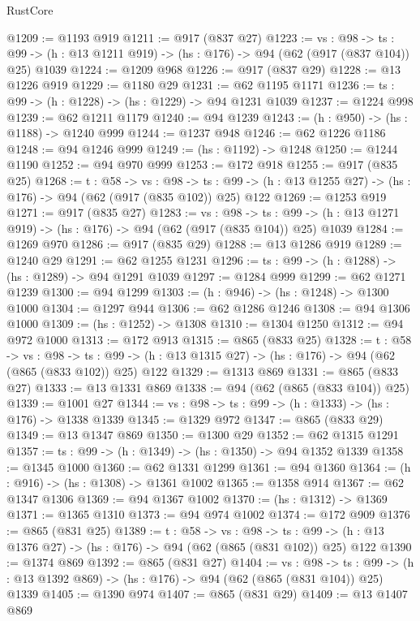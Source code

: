 \begin{lexlean}{RustCore}
\begin{coremodule}
@1209 := @1193 @919
@1211 := @917 (@837 @27)
@1223 := {vs : @98} ->
  {ts : @99} -> (h : @13 @1211 @919) -> (hs : @176) -> @94 (@62 (@917 (@837 @104)) @25) @1039
@1224 := @1209 @968
@1226 := @917 (@837 @29)
@1228 := @13 @1226 @919
@1229 := @1180 @29
@1231 := @62 @1195 @1171
@1236 := {ts : @99} -> (h : @1228) -> (hs : @1229) -> @94 @1231 @1039
@1237 := @1224 @998
@1239 := @62 @1211 @1179
@1240 := @94 @1239
@1243 := (h : @950) -> (hs : @1188) -> @1240 @999
@1244 := @1237 @948
@1246 := @62 @1226 @1186
@1248 := @94 @1246 @999
@1249 := (hs : @1192) -> @1248
@1250 := @1244 @1190
@1252 := @94 @970 @999
@1253 := @172 @918
@1255 := @917 (@835 @25)
@1268 := {t : @58} ->
  {vs : @98} ->
  {ts : @99} -> (h : @13 @1255 @27) -> (hs : @176) -> @94 (@62 (@917 (@835 @102)) @25) @122
@1269 := @1253 @919
@1271 := @917 (@835 @27)
@1283 := {vs : @98} ->
  {ts : @99} -> (h : @13 @1271 @919) -> (hs : @176) -> @94 (@62 (@917 (@835 @104)) @25) @1039
@1284 := @1269 @970
@1286 := @917 (@835 @29)
@1288 := @13 @1286 @919
@1289 := @1240 @29
@1291 := @62 @1255 @1231
@1296 := {ts : @99} -> (h : @1288) -> (hs : @1289) -> @94 @1291 @1039
@1297 := @1284 @999
@1299 := @62 @1271 @1239
@1300 := @94 @1299
@1303 := (h : @946) -> (hs : @1248) -> @1300 @1000
@1304 := @1297 @944
@1306 := @62 @1286 @1246
@1308 := @94 @1306 @1000
@1309 := (hs : @1252) -> @1308
@1310 := @1304 @1250
@1312 := @94 @972 @1000
@1313 := @172 @913
@1315 := @865 (@833 @25)
@1328 := {t : @58} ->
  {vs : @98} ->
  {ts : @99} -> (h : @13 @1315 @27) -> (hs : @176) -> @94 (@62 (@865 (@833 @102)) @25) @122
@1329 := @1313 @869
@1331 := @865 (@833 @27)
@1333 := @13 @1331 @869
@1338 := @94 (@62 (@865 (@833 @104)) @25)
@1339 := @1001 @27
@1344 := {vs : @98} -> {ts : @99} -> (h : @1333) -> (hs : @176) -> @1338 @1339
@1345 := @1329 @972
@1347 := @865 (@833 @29)
@1349 := @13 @1347 @869
@1350 := @1300 @29
@1352 := @62 @1315 @1291
@1357 := {ts : @99} -> (h : @1349) -> (hs : @1350) -> @94 @1352 @1339
@1358 := @1345 @1000
@1360 := @62 @1331 @1299
@1361 := @94 @1360
@1364 := (h : @916) -> (hs : @1308) -> @1361 @1002
@1365 := @1358 @914
@1367 := @62 @1347 @1306
@1369 := @94 @1367 @1002
@1370 := (hs : @1312) -> @1369
@1371 := @1365 @1310
@1373 := @94 @974 @1002
@1374 := @172 @909
@1376 := @865 (@831 @25)
@1389 := {t : @58} ->
  {vs : @98} ->
  {ts : @99} -> (h : @13 @1376 @27) -> (hs : @176) -> @94 (@62 (@865 (@831 @102)) @25) @122
@1390 := @1374 @869
@1392 := @865 (@831 @27)
@1404 := {vs : @98} ->
  {ts : @99} -> (h : @13 @1392 @869) -> (hs : @176) -> @94 (@62 (@865 (@831 @104)) @25) @1339
@1405 := @1390 @974
@1407 := @865 (@831 @29)
@1409 := @13 @1407 @869

\end{coremodule}
\end{lexlean}
